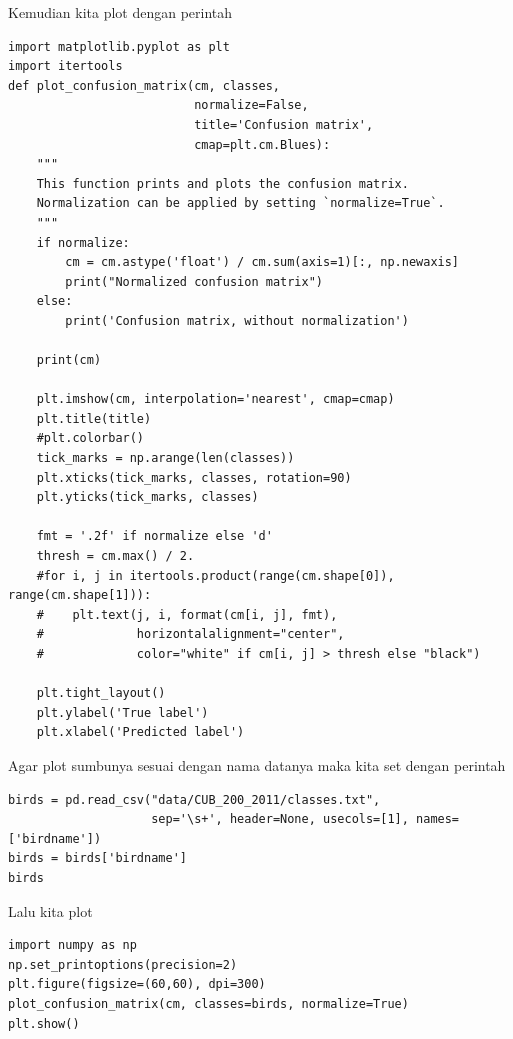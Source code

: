Kemudian kita plot dengan perintah
\begin{lstlisting}[caption=Plotting Confusion Matrix,label={lst:3.16}]
import matplotlib.pyplot as plt
import itertools
def plot_confusion_matrix(cm, classes,
                          normalize=False,
                          title='Confusion matrix',
                          cmap=plt.cm.Blues):
    """
    This function prints and plots the confusion matrix.
    Normalization can be applied by setting `normalize=True`.
    """
    if normalize:
        cm = cm.astype('float') / cm.sum(axis=1)[:, np.newaxis]
        print("Normalized confusion matrix")
    else:
        print('Confusion matrix, without normalization')

    print(cm)

    plt.imshow(cm, interpolation='nearest', cmap=cmap)
    plt.title(title)
    #plt.colorbar()
    tick_marks = np.arange(len(classes))
    plt.xticks(tick_marks, classes, rotation=90)
    plt.yticks(tick_marks, classes)

    fmt = '.2f' if normalize else 'd'
    thresh = cm.max() / 2.
    #for i, j in itertools.product(range(cm.shape[0]), range(cm.shape[1])):
    #    plt.text(j, i, format(cm[i, j], fmt),
    #             horizontalalignment="center",
    #             color="white" if cm[i, j] > thresh else "black")

    plt.tight_layout()
    plt.ylabel('True label')
    plt.xlabel('Predicted label')

\end{lstlisting}

Agar plot sumbunya sesuai dengan nama datanya maka kita set dengan perintah
\begin{lstlisting}[caption=Membaca file classes.txt,label={lst:3.17}]
birds = pd.read_csv("data/CUB_200_2011/classes.txt",
                    sep='\s+', header=None, usecols=[1], names=['birdname'])
birds = birds['birdname']
birds

\end{lstlisting}

Lalu kita plot
\begin{lstlisting}[caption=Plot hasil perubahan label,label={lst:3.18}]
import numpy as np
np.set_printoptions(precision=2)
plt.figure(figsize=(60,60), dpi=300)
plot_confusion_matrix(cm, classes=birds, normalize=True)
plt.show()
\end{lstlisting}



